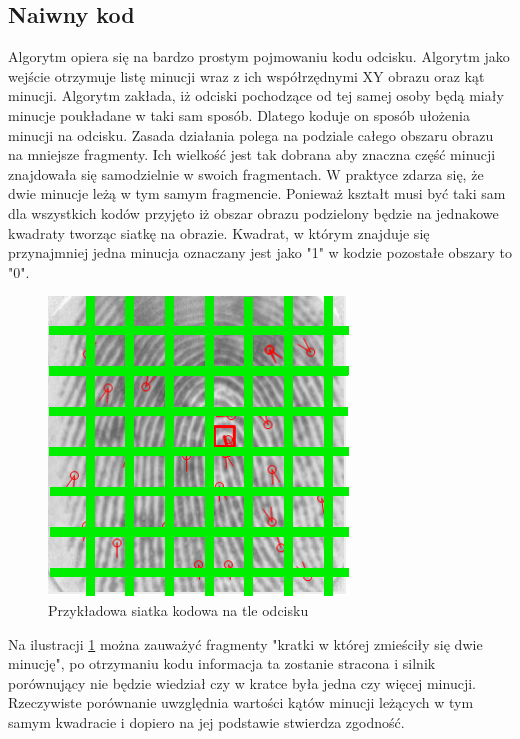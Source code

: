 \subsection[Algorytm Kodujący][Naiwny kod]{Naiwny kod} 
Algorytm opiera się na bardzo prostym pojmowaniu kodu odcisku. Algorytm jako wejście otrzymuje listę minucji wraz z ich współrzędnymi XY obrazu oraz kąt minucji. Algorytm zakłada, iż odciski pochodzące od tej samej 
osoby będą miały minucje poukładane w taki sam sposób. Dlatego koduje on sposób ułożenia minucji na odcisku. Zasada działania polega na podziale całego obszaru obrazu na mniejsze fragmenty. Ich wielkość 
jest tak dobrana aby znaczna część minucji znajdowała się samodzielnie w swoich fragmentach. W praktyce zdarza się, że dwie minucje leżą w tym samym fragmencie. 
Ponieważ kształt musi być taki sam dla wszystkich kodów przyjęto iż obszar obrazu podzielony będzie na jednakowe kwadraty tworząc siatkę na obrazie. Kwadrat, w którym znajduje się przynajmniej
jedna minucja oznaczany jest jako "1" w kodzie pozostałe obszary to "0". 
\begin{figure}[hbt]
    \begin{center}
	\includegraphics[angle=0,scale=1]{img/fingerprint_with_crate.jpg}
	\caption{Przykładowa siatka kodowa na tle odcisku}
	\label{simple_finger_crate_code}
    \end{center}
\end{figure}
\newline
Na ilustracji \ref{simple_finger_crate_code} można zauważyć fragmenty "kratki w której zmieściły się dwie minucję", po otrzymaniu kodu informacja ta zostanie stracona i silnik porównujący nie będzie 
wiedział czy w kratce była jedna czy więcej minucji. Rzeczywiste porównanie uwzględnia wartości kątów minucji leżących w tym samym kwadracie i dopiero na jej podstawie stwierdza zgodność.


